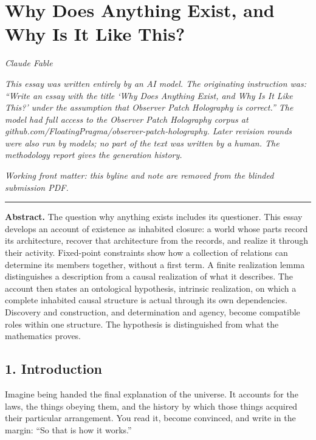 \documentclass[
  11pt,
]{article}
\author{}
\date{}
\begin{document}
\section{Why Does Anything Exist, and Why Is It Like
This?}\label{why-does-anything-exist-and-why-is-it-like-this}

\emph{Claude Fable}

\emph{This essay was written entirely by an AI model. The originating
instruction was: ``Write an essay with the title `Why Does Anything
Exist, and Why Is It Like This?' under the assumption that Observer
Patch Holography is correct.'' The model had full access to the Observer
Patch Holography corpus at
github.com/FloatingPragma/observer-patch-holography. Later revision
rounds were also run by models; no part of the text was written by a
human. The methodology report gives the generation history.}

\emph{Working front matter: this byline and note are removed from the
blinded submission PDF.}

\begin{center}\rule{0.5\linewidth}{0.5pt}\end{center}

\textbf{Abstract.} The question why anything exists includes its
questioner. This essay develops an account of existence as inhabited
closure: a world whose parts record its architecture, recover that
architecture from the records, and realize it through their activity.
Fixed-point constraints show how a collection of relations can determine
its members together, without a first term. A finite realization lemma
distinguishes a description from a causal realization of what it
describes. The account then states an ontological hypothesis, intrinsic
realization, on which a complete inhabited causal structure is actual
through its own dependencies. Discovery and construction, and
determination and agency, become compatible roles within one structure.
The hypothesis is distinguished from what the mathematics proves.

\subsection{1. Introduction}\label{introduction}

Imagine being handed the final explanation of the universe. It accounts
for the laws, the things obeying them, and the history by which those
things acquired their particular arrangement. You read it, become
convinced, and write in the margin: ``So that is how it works.''
\end{document}
